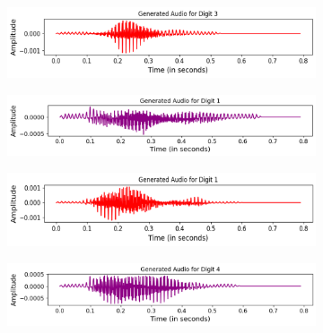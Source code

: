 \documentclass[12pt]{article}
\begin{document}
\begin{figure}[htbp]
    \centering
    \begin{subfigure}[b]{0.45\linewidth}
        \centering
        \includegraphics[width=\linewidth]{abc11.png}
        \label{fig:sub1}
    \end{subfigure}
    \hfill
    \begin{subfigure}[b]{0.45\linewidth}
        \centering
        \includegraphics[width=\linewidth]{gen_1.png}
        \label{fig:sub2}
    \end{subfigure}
    
    \medskip
    
    \begin{subfigure}[b]{0.45\linewidth}
        \centering
        \includegraphics[width=\linewidth]{ab2.png}
        \label{fig:sub3}
    \end{subfigure}
    \hfill
    \begin{subfigure}[b]{0.45\linewidth}
        \centering
        \includegraphics[width=\linewidth]{gen_4.png}
        \label{fig:sub4}
    \end{subfigure}
    

\end{figure}
\end{document}
